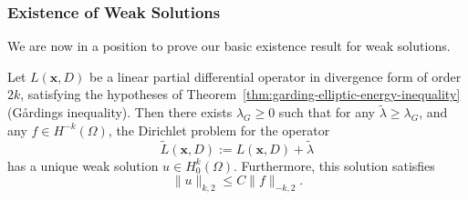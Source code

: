 \subsubsection{Existence of Weak Solutions}\label{subsec:dirichlet-weak-solution-existence}

We are now in a position to prove our basic existence result for weak solutions.

\begin{Theorem}
\label{thm:weak-dirichlet-positive-shift-existence}
Let $L(\bm{x},D)$ be a linear partial differential operator in divergence form of order $2k$, satisfying the hypotheses of Theorem~\ref{thm:garding-elliptic-energy-inequality} (Gårding\textquotesingle s inequality). Then there exists $\lambda_G\geq0$ such that for any $\widetilde\lambda\geq\lambda_G$, and any $f\in H^{-k}(\Omega)$, the Dirichlet problem for the operator
\begin{equation}\label{eq:weak-dirichlet-positive-shifted-operator}
\widetilde L(\bm{x},D):=L(\bm{x},D)+\widetilde\lambda
\end{equation}
has a unique weak solution $u\in H_0^k(\Omega)$. Furthermore, this solution satisfies
\begin{equation}\label{eq:weak-dirichlet-solution-negative-norm-bound}
\|u\|_{k,2}\leq C\|f\|_{-k,2}.
\end{equation}

\end{Theorem}

